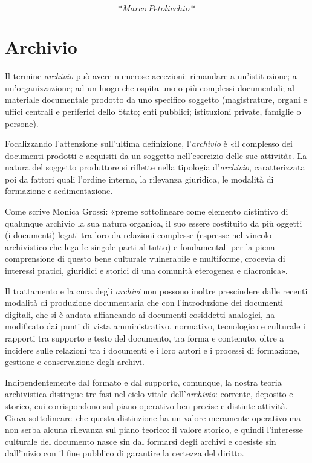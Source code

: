 \documentclass[
  b5paper,
  twoside,
  12pt,
  chapterprefix=false,
  bibliography=totocnumbered,
  parskip=false]{scrbook}
\begin{document}
\[*Marco~Petolicchio*\]

\hypertarget{archivio}{%
\chapter{Archivio}\label{archivio}}

Il termine \emph{archivio} può avere numerose accezioni: rimandare a
un'istituzione; a un'organizzazione; ad un luogo che ospita uno o più
complessi documentali; al materiale documentale prodotto da uno
specifico soggetto (magistrature, organi e uffici centrali e periferici
dello Stato; enti pubblici; istituzioni private, famiglie o persone).

Focalizzando l'attenzione sull'ultima definizione, l'\emph{archivio} è «il
complesso dei documenti prodotti e acquisiti da un soggetto
nell'esercizio delle sue attività». La natura del soggetto produttore si
riflette nella tipologia d'\emph{archivio}, caratterizzata poi da fattori
quali l'ordine interno, la rilevanza giuridica, le modalità di
formazione e sedimentazione.

Come scrive Monica Grossi: «preme sottolineare come elemento distintivo
di qualunque archivio la sua natura organica, il suo essere costituito
da più oggetti (i documenti) legati tra loro da relazioni complesse
(espresse nel vincolo archivistico che lega le singole parti al tutto) e
fondamentali per la piena comprensione di questo bene culturale
vulnerabile e multiforme, crocevia di interessi pratici, giuridici e
storici di una comunità eterogenea e diacronica».

Il trattamento e la cura degli \emph{archivi} non possono inoltre prescindere
dalle recenti modalità di produzione documentaria che con l'introduzione
dei documenti digitali, che si è andata affiancando ai documenti
cosiddetti analogici, ha modificato dai punti di vista amministrativo,
normativo, tecnologico e culturale i rapporti tra supporto e testo del
documento, tra forma e contenuto, oltre a incidere sulle relazioni tra i
documenti e i loro autori e i processi di formazione, gestione e
conservazione degli archivi.

Indipendentemente dal formato e dal supporto, comunque, la nostra teoria
archivistica distingue tre fasi nel ciclo vitale dell'\emph{archivio}:
corrente, deposito e storico, cui corrispondono sul piano operativo ben
precise e distinte attività. Giova sottolineare~che questa distinzione
ha un valore meramente operativo ma non serba alcuna rilevanza sul piano
teorico: il valore storico, e quindi l'interesse culturale del documento
nasce sin dal formarsi degli archivi e coesiste sin dall'inizio con il
fine pubblico di garantire la certezza del diritto.
\end{document}
